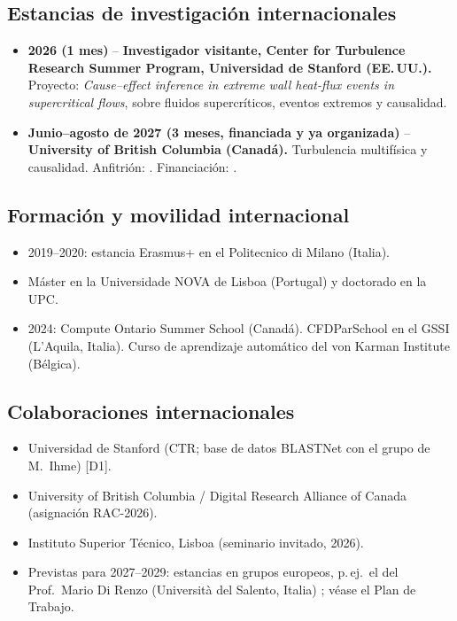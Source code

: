 \documentclass[11pt]{article}
\begin{document}
\subsection{Estancias de investigaci\'on internacionales}
\begin{itemize}
  \item \textbf{2026 (1 mes)} -- \textbf{Investigador visitante, Center for Turbulence
  Research Summer Program, Universidad de Stanford (EE.\,UU.).} Proyecto: \emph{Cause--effect
  inference in extreme wall heat-flux events in supercritical flows}, sobre fluidos
  supercr\'iticos, eventos extremos y causalidad. 
  \item \textbf{Junio--agosto de 2027 (3 meses, financiada y ya organizada)} --
  \textbf{University of British Columbia (Canad\'a).} Turbulencia multif\'isica y causalidad.
  Anfitri\'on: . Financiaci\'on:
  . 
\end{itemize}

\subsection{Formaci\'on y movilidad internacional}
\begin{itemize}
  \item 2019--2020: estancia Erasmus+ en el Politecnico di Milano (Italia).
  \item M\'aster en la Universidade NOVA de Lisboa (Portugal) y doctorado en la UPC.
  \item 2024: Compute Ontario Summer School (Canad\'a). CFDParSchool en el GSSI (L'Aquila,
  Italia). Curso de aprendizaje autom\'atico del von Karman Institute (B\'elgica).
\end{itemize}

\subsection{Colaboraciones internacionales}
\begin{itemize}
  \item Universidad de Stanford (CTR; base de datos BLASTNet con el grupo de M.\ Ihme) [D1].
  \item University of British Columbia / Digital Research Alliance of Canada (asignaci\'on RAC-2026).
  \item Instituto Superior T\'ecnico, Lisboa (seminario invitado, 2026).
  \item Previstas para 2027--2029: estancias en grupos europeos, p.\,ej.\ el del Prof.\ Mario
  Di Renzo (Universit\`a del Salento, Italia) ; v\'ease el Plan de Trabajo.
\end{itemize}
\end{document}

